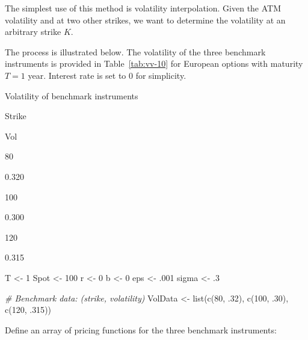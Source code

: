 \documentclass[]{tufte-book}
\newenvironment{Shaded}{}{}
\newcommand{\CommentTok}[1]{\textcolor[rgb]{0.38,0.63,0.69}{\textit{#1}}}
\newcommand{\DecValTok}[1]{\textcolor[rgb]{0.25,0.63,0.44}{#1}}
\newcommand{\FunctionTok}[1]{\textcolor[rgb]{0.02,0.16,0.49}{#1}}
\newcommand{\NormalTok}[1]{#1}
\newcommand{\OtherTok}[1]{\textcolor[rgb]{0.00,0.44,0.13}{#1}}
\begin{document}
The simplest use of this method is volatility interpolation. Given the ATM
volatility and at two other strikes, we want to determine the volatility
at an arbitrary strike \(K\).

The process is illustrated below. The volatility of the three benchmark
instruments is provided in
Table~\ref{tab:vv-10} for European options with maturity \(T=1\) year.
Interest rate is set to 0 for simplicity.

\label{tab:vv-10}Volatility of benchmark instruments

Strike

Vol

80

0.320

100

0.300

120

0.315

\begin{Shaded}
\begin{Highlighting}[]
\NormalTok{  T }\OtherTok{\textless{}{-}} \DecValTok{1}
\NormalTok{  Spot }\OtherTok{\textless{}{-}} \DecValTok{100}
\NormalTok{  r }\OtherTok{\textless{}{-}} \DecValTok{0}
\NormalTok{  b }\OtherTok{\textless{}{-}} \DecValTok{0}
\NormalTok{  eps }\OtherTok{\textless{}{-}}\NormalTok{ .}\DecValTok{001}
\NormalTok{  sigma }\OtherTok{\textless{}{-}}\NormalTok{ .}\DecValTok{3}

  \CommentTok{\# Benchmark data: (strike, volatility)}
\NormalTok{  VolData }\OtherTok{\textless{}{-}} \FunctionTok{list}\NormalTok{(}\FunctionTok{c}\NormalTok{(}\DecValTok{80}\NormalTok{, .}\DecValTok{32}\NormalTok{), }\FunctionTok{c}\NormalTok{(}\DecValTok{100}\NormalTok{, .}\DecValTok{30}\NormalTok{), }\FunctionTok{c}\NormalTok{(}\DecValTok{120}\NormalTok{, .}\DecValTok{315}\NormalTok{))}
\end{Highlighting}
\end{Shaded}

Define an array of pricing functions for the three benchmark
instruments:
\end{document}
